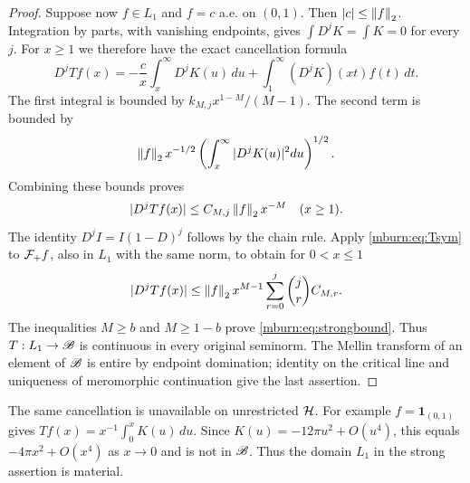 \begin{proof}
Suppose now $f\in L_1$ and $f=c$ a.e. on $(0,1)$. Then
$|c|\leq\left\lVert f\right\rVert_2$. Integration by parts, with vanishing
endpoints, gives $\int D^jK=\int K=0$ for every $j$. For $x\geq1$
we therefore have the exact cancellation formula
\[
 D^jTf(x)=-\frac c x\int_x^\infty D^jK(u)\,du
                      +\int_1^\infty(D^jK)(xt)f(t)\,dt.
\]
The first integral is bounded by $k_{M,j}x^{1-M}/(M-1)$.
The second term is bounded by
\[
 \left\lVert f\right\rVert_2x^{-1/2}\left(\int_x^\infty|D^jK(u)|^2du\right)^{1/2}.
\]
Combining these bounds proves
\begin{equation}\label{mburn:eq:tail}
 |D^jTf(x)|\leq C_{M,j}\left\lVert f\right\rVert_2 x^{-M}\quad(x\geq1).
\end{equation}
The identity $D^jI=I(1-D)^j$ follows by the chain rule. Apply
\eqref{mburn:eq:Tsym} to $\mathcal F_+ f$, also in $L_1$ with the same norm,
to obtain for $0<x\leq1$
\[
 |D^jTf(x)|\leq\left\lVert f\right\rVert_2 x^{M-1}
                           \sum_{r=0}^j\binom jr C_{M,r}.
\]
The inequalities $M\geq b$ and $M\geq1-b$ prove
\eqref{mburn:eq:strongbound}. Thus $T:L_1\to\mathscr B$ is continuous in
every original seminorm. The Mellin transform of an element of
$\mathscr B$ is entire by endpoint domination; identity on the critical
line and uniqueness of meromorphic continuation give the last
assertion.
\end{proof}

The same cancellation is unavailable on unrestricted $\mathcal H$.
For example $f=\mathbf1_{(0,1)}$ gives
$Tf(x)=x^{-1}\int_0^xK(u)\,du$. Since
$K(u)=-12\pi u^2+O(u^4)$, this equals
$-4\pi x^2+O(x^4)$ as $x\to0$ and is not in $\mathscr B$.
Thus the domain $L_1$ in the strong assertion is material.

